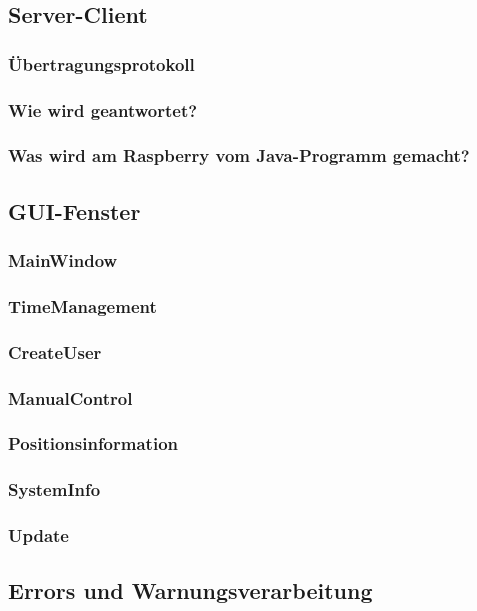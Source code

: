 \subsection{Server-Client}
\subsubsection{Übertragungsprotokoll}
\subsubsection{Wie wird geantwortet?}
\subsubsection{Was wird am Raspberry vom Java-Programm gemacht?}

\subsection{GUI-Fenster}
\subsubsection{MainWindow}
\subsubsection{TimeManagement}
\subsubsection{CreateUser}
\subsubsection{ManualControl}
\subsubsection{Positionsinformation}
\subsubsection{SystemInfo}
\subsubsection{Update}
\subsection{Errors und Warnungsverarbeitung}

